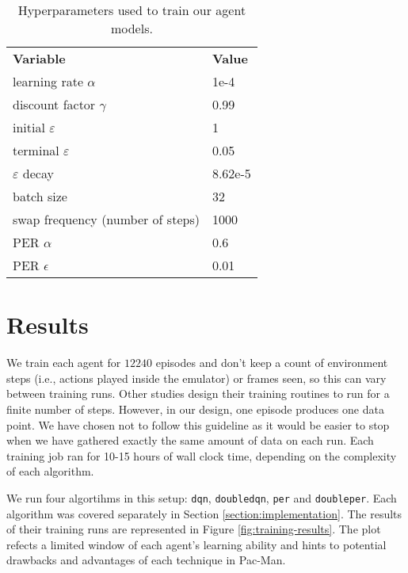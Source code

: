 \begin{table}
    \centering
        \begin{tabular}{ll}
            \textbf{Variable}                  & \textbf{Value}   \\
            learning rate $\alpha$             & 1e-4    \\
            discount factor $\gamma$           & 0.99    \\
            initial $\varepsilon$              & 1       \\
            terminal $\varepsilon$             & 0.05    \\
            $\varepsilon$ decay                & 8.62e-5 \\
            batch size                         & 32      \\
            swap frequency (number of steps)   & 1000    \\
            PER $\alpha$                       & 0.6     \\
            PER $\epsilon$                     & 0.01    \\
        \end{tabular}%
        \caption{Hyperparameters used to train our agent models.}
    \label{tab:our-hyperparameters}
\end{table}

\section*{Results}
We train each agent for $12240$ episodes and don't keep a count of environment steps (i.e., actions played inside the emulator) or frames seen, so this can vary between training runs.
Other studies design their training routines to run for a finite number of steps.
However, in our design, one episode produces one data point. We have chosen not to follow this guideline as it would be easier to stop when we have gathered exactly the same amount of data on each run.
Each training job ran for 10-15 hours of wall clock time, depending on the complexity of each algorithm.

We run four algortihms in this setup: \texttt{dqn}, \texttt{doubledqn}, \texttt{per} and \texttt{doubleper}.
Each algorithm was covered separately in Section \ref{section:implementation}.
The results of their training runs are represented in Figure \ref{fig:training-results}.
The plot refects a limited window of each agent's learning ability and hints to potential drawbacks and advantages of each technique in Pac-Man.

